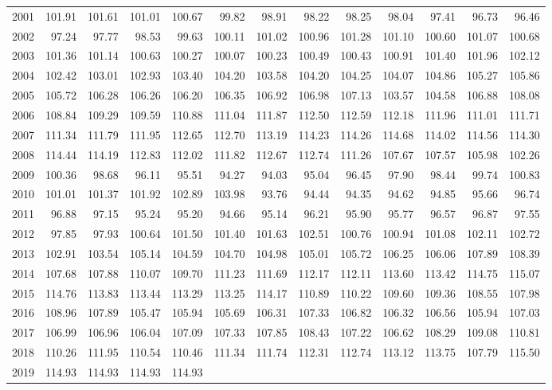 \begin{longtable}{rrrrrrrrrrrrr}
  2001 & 101.91 & 101.61 & 101.01 & 100.67 & 99.82 & 98.91 & 98.22 & 98.25 & 98.04 & 97.41 & 96.73 & 96.46 \\ 
  2002 & 97.24 & 97.77 & 98.53 & 99.63 & 100.11 & 101.02 & 100.96 & 101.28 & 101.10 & 100.60 & 101.07 & 100.68 \\ 
  2003 & 101.36 & 101.14 & 100.63 & 100.27 & 100.07 & 100.23 & 100.49 & 100.43 & 100.91 & 101.40 & 101.96 & 102.12 \\ 
  2004 & 102.42 & 103.01 & 102.93 & 103.40 & 104.20 & 103.58 & 104.20 & 104.25 & 104.07 & 104.86 & 105.27 & 105.86 \\ 
  2005 & 105.72 & 106.28 & 106.26 & 106.20 & 106.35 & 106.92 & 106.98 & 107.13 & 103.57 & 104.58 & 106.88 & 108.08 \\ 
  2006 & 108.84 & 109.29 & 109.59 & 110.88 & 111.04 & 111.87 & 112.50 & 112.59 & 112.18 & 111.96 & 111.01 & 111.71 \\ 
  2007 & 111.34 & 111.79 & 111.95 & 112.65 & 112.70 & 113.19 & 114.23 & 114.26 & 114.68 & 114.02 & 114.56 & 114.30 \\ 
  2008 & 114.44 & 114.19 & 112.83 & 112.02 & 111.82 & 112.67 & 112.74 & 111.26 & 107.67 & 107.57 & 105.98 & 102.26 \\ 
  2009 & 100.36 & 98.68 & 96.11 & 95.51 & 94.27 & 94.03 & 95.04 & 96.45 & 97.90 & 98.44 & 99.74 & 100.83 \\ 
  2010 & 101.01 & 101.37 & 101.92 & 102.89 & 103.98 & 93.76 & 94.44 & 94.35 & 94.62 & 94.85 & 95.66 & 96.74 \\ 
  2011 & 96.88 & 97.15 & 95.24 & 95.20 & 94.66 & 95.14 & 96.21 & 95.90 & 95.77 & 96.57 & 96.87 & 97.55 \\ 
  2012 & 97.85 & 97.93 & 100.64 & 101.50 & 101.40 & 101.63 & 102.51 & 100.76 & 100.94 & 101.08 & 102.11 & 102.72 \\ 
  2013 & 102.91 & 103.54 & 105.14 & 104.59 & 104.70 & 104.98 & 105.01 & 105.72 & 106.25 & 106.06 & 107.89 & 108.39 \\ 
  2014 & 107.68 & 107.88 & 110.07 & 109.70 & 111.23 & 111.69 & 112.17 & 112.11 & 113.60 & 113.42 & 114.75 & 115.07 \\ 
  2015 & 114.76 & 113.83 & 113.44 & 113.29 & 113.25 & 114.17 & 110.89 & 110.22 & 109.60 & 109.36 & 108.55 & 107.98 \\ 
  2016 & 108.96 & 107.89 & 105.47 & 105.94 & 105.69 & 106.31 & 107.33 & 106.82 & 106.32 & 106.56 & 105.94 & 107.03 \\ 
  2017 & 106.99 & 106.96 & 106.04 & 107.09 & 107.33 & 107.85 & 108.43 & 107.22 & 106.62 & 108.29 & 109.08 & 110.81 \\ 
  2018 & 110.26 & 111.95 & 110.54 & 110.46 & 111.34 & 111.74 & 112.31 & 112.74 & 113.12 & 113.75 & 107.79 & 115.50 \\ 
  2019 & 114.93 & 114.93 & 114.93 & 114.93 &  &  &  &  &  &  &  &  \\ 
   \hline
\hline
\end{longtable}
